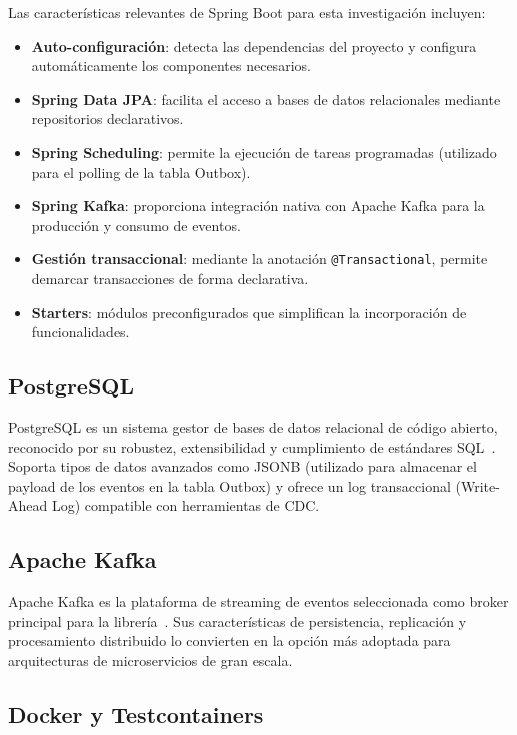 Las características relevantes de Spring Boot para esta investigación incluyen:

\begin{itemize}
    \item \textbf{Auto-configuración}: detecta las dependencias del proyecto y configura automáticamente los componentes necesarios.
    \item \textbf{Spring Data JPA}: facilita el acceso a bases de datos relacionales mediante repositorios declarativos.
    \item \textbf{Spring Scheduling}: permite la ejecución de tareas programadas (utilizado para el polling de la tabla Outbox).
    \item \textbf{Spring Kafka}: proporciona integración nativa con Apache Kafka para la producción y consumo de eventos.
    \item \textbf{Gestión transaccional}: mediante la anotación \texttt{@Transactional}, permite demarcar transacciones de forma declarativa.
    \item \textbf{Starters}: módulos preconfigurados que simplifican la incorporación de funcionalidades.
\end{itemize}

\subsection{PostgreSQL}

PostgreSQL es un sistema gestor de bases de datos relacional de código abierto, reconocido por su robustez, extensibilidad y cumplimiento de estándares SQL~\parencite{kleppmann2017}. Soporta tipos de datos avanzados como JSONB (utilizado para almacenar el payload de los eventos en la tabla Outbox) y ofrece un log transaccional (Write-Ahead Log) compatible con herramientas de CDC.

\subsection{Apache Kafka}

Apache Kafka es la plataforma de streaming de eventos seleccionada como broker principal para la librería~\parencite{narkhede2017}. Sus características de persistencia, replicación y procesamiento distribuido lo convierten en la opción más adoptada para arquitecturas de microservicios de gran escala.

\subsection{Docker y Testcontainers}

